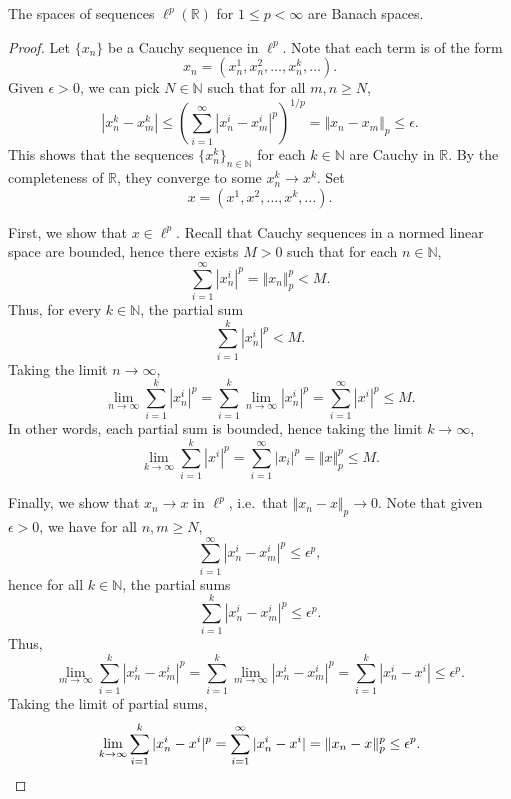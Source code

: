 \documentclass[11pt]{article}
\newcommand{\R}{\mathbb{R}}
\newcommand{\N}{\mathbb{N}}
\newcommand{\norm}[1]{\Vert #1 \Vert}
\theoremstyle{definition}
\theoremstyle{remark}
\begin{document}
    \begin{lemma}
        The spaces of sequences $\ell^p(\R)$ for $1 \leq p < \infty$ are Banach
        spaces.
    \end{lemma}
    \begin{proof}
        Let $\{x_n\}$ be a Cauchy sequence in $\ell^p$. Note that each term is of the
        form \[
            x_n = (x_n^1, x_n^2, \dots, x_n^k, \dots).
        \] Given $\epsilon > 0$, we can pick $N \in \N$ such that for all $m, n \geq
        N$, \[
            |x_n^k - x_m^k| \leq \left(\sum_{i = 1}^\infty |x_n^i -
            x_m^i|^p\right)^{1 / p} = \norm{x_n - x_m}_p \leq \epsilon.
        \] This shows that the sequences $\{x_n^k\}_{n \in \N}$ for each $k \in \N$
        are Cauchy in $\R$. By the completeness of $\R$, they converge to some $x_n^k
        \to x^k$. Set \[
            x = (x^1, x^2, \dots, x^k, \dots).
        \]

        First, we show that $x \in \ell^p$. Recall that Cauchy sequences in a normed
        linear space are bounded, hence there exists $M > 0$ such that for each $n
        \in \N$, \[
            \sum_{i = 1}^\infty |x_n^i|^p = \norm{x_n}_p^p < M.
        \] Thus, for every $k \in \N$, the partial sum \[
            \sum_{i = 1}^k |x_n^i|^p < M.
        \] Taking the limit $n \to \infty$, \[
            \lim_{n \to \infty} \sum_{i = 1}^k |x_n^i|^p = \sum_{i = 1}^k \lim_{n \to
            \infty} |x_n^i|^p = \sum_{i = 1}^\infty |x^i|^p \leq M.
        \] In other words, each partial sum is bounded, hence taking the limit $k \to
        \infty$, \[
            \lim_{k \to \infty} \sum_{i = 1}^k |x^i|^p = \sum_{i = 1}^\infty |x_i|^p
            = \norm{x}_p^p \leq M.
        \]

        Finally, we show that $x_n \to x$ in $\ell^p$, i.e.\ that $\norm{x_n - x}_p
        \to 0$. Note that given $\epsilon > 0$, we have for all $n, m \geq N$, \[
            \sum_{i = 1}^\infty |x_n^i - x_m^i|^p \leq \epsilon^p,
        \] hence for all $k \in \N$, the partial sums \[
            \sum_{i = 1}^k |x_n^i - x_m^i|^p \leq \epsilon^p.
        \] Thus, \[
            \lim_{m \to \infty} \sum_{i = 1}^k |x_n^i - x_m^i|^p = \sum_{i = 1}^k
            \lim_{m \to \infty} |x_n^i - x_m^i|^p = \sum_{i = 1}^k |x_n^i - x^i| \leq
            \epsilon^p.
        \] Taking the limit of partial sums, \[
            \lim_{k \to \infty} \sum_{i = 1}^k |x_n^i - x^i|^p = \sum_{i = 1}^\infty
            |x_n^i - x^i| = \norm{x_n - x}_p^p \leq \epsilon^p. \qedhere
        \]
    \end{proof}
\end{document}
